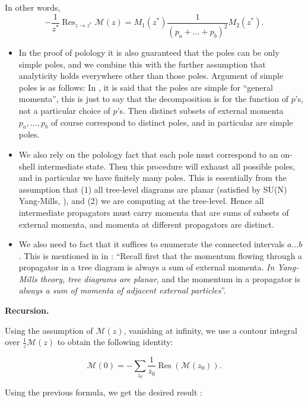 In other words, 
\[
	- \frac{1}{z^*} \operatorname{Res} _{z \to  z^*} \mathcal{M}(z) = M_1(z^*) \frac{1}{(p_a + \ldots + p_b)^2} M_2(z^*)
.\]

\begin{itemize}
    \item In the proof of polology it is also guaranteed that the poles can be only simple poles, and we combine this with the further assumption that analyticity holds everywhere other than those poles. Argument of simple poles is as follows: In \autocite[pg.~4]{Britto:2005fq}, it is said that the poles are simple for ``general momenta'', this is just to say that the decomposition is for the function of $p$'s, not a particular choice of $p$'s. Then distinct subsets of external momenta $p_a, \ldots, p_b$ of course correspond to distinct poles, and in particular are simple poles.

    \item We also rely on the polology fact that each pole must correspond to an on-shell intermediate state. Then this procedure will exhaust all possible poles, and in particular we have finitely many poles. This is essentially from the assumption that (1) all tree-level diagrams are planar (satisfied by SU(N) Yang-Mills, \followup ), and (2) we are computing at the tree-level. Hence all intermediate propagators must carry momenta that are sums of subsets of external momenta, and momenta at different propagators are distinct.

    \item We also need to fact that it suffices to enumerate the connected intervals $a \ldots b$. This is mentioned in in \autocite[p.~3]{Britto:2005fq}: ``Recall first that the momentum flowing through a propagator in a tree diagram is always a sum of external momenta. \textit{In Yang-Mills theory, tree diagrams are planar}, and the momentum in a propagator is \textit{always a sum of momenta of adjacent external particles}''.
\end{itemize}

\textbf{Recursion.}

Using the assumption of $\mathcal{M}(z)$, vanishing at infinity, we use a contour integral over $\frac{1}{z} \mathcal{M}(z)$ to obtain the following identity:

\[
	\mathcal{M}(0) = - \sum_{z_0} \frac{1}{z_0} \operatorname{Res} \left( \mathcal{M}(z_0) \right) 
.\] 

Using the previous formula, we get the desired result \autocite[(27.117)]{schwartzQFT2014}:

